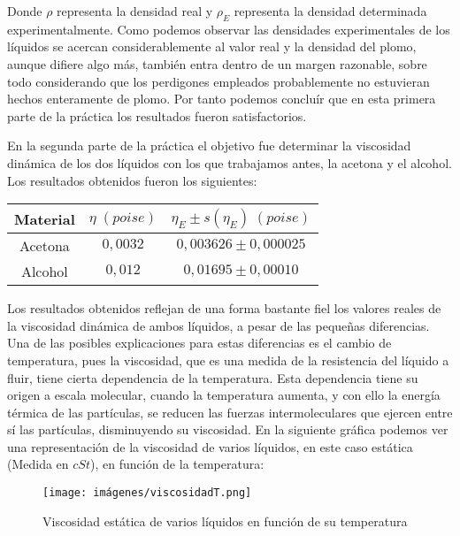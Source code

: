 \documentclass[a4paper,12pt,titlepage]{article}
\begin{document}
Donde $\rho$ representa la densidad real y $\rho_E$ representa la densidad determinada experimentalmente. Como podemos observar las densidades experimentales de los líquidos se acercan considerablemente al valor real y la densidad del plomo, aunque difiere algo más, también entra dentro de un margen razonable, sobre todo considerando que los perdigones empleados probablemente no estuvieran hechos enteramente de plomo. Por tanto podemos concluír que en esta primera parte de la práctica los resultados fueron satisfactorios.

\par En la segunda parte de la práctica el objetivo fue determinar la viscosidad dinámica de los dos líquidos con los que trabajamos antes, la acetona y el alcohol. Los resultados obtenidos fueron los siguientes:

\newpage

\begin{table}[h!]
    \centering
    \begin{tabular}{|c|c|c|}
        \hline
        Material & $\eta \; (poise)$ & $\eta_E \pm s(\eta_E) \; (poise)$ \\ \hline
        Acetona & $0,0032$ & $0,003626 \pm 0,000025$ \\ \hline
        Alcohol &$0,012$ & $0,01695 \pm  0,00010$\\ \hline
    \end{tabular}
\end{table}

Los resultados obtenidos reflejan de una forma bastante fiel los valores reales de la viscosidad dinámica de ambos líquidos, a pesar de las pequeñas diferencias. Una de las posibles explicaciones para estas diferencias es el cambio de temperatura, pues la viscosidad, que es una medida de la resistencia del líquido a fluir, tiene cierta dependencia de la temperatura. Esta dependencia tiene su origen a escala molecular, cuando la temperatura aumenta, y con ello la energía térmica de las partículas, se reducen las fuerzas intermoleculares que ejercen entre sí las partículas, disminuyendo su viscosidad. En la siguiente gráfica podemos ver una representación de la viscosidad de varios líquidos, en este caso estática (Medida en $cSt$), en función de la temperatura:

\begin{figure}[h!]
    \centering
    \texttt{[image: imágenes/viscosidadT.png]}
    \caption{Viscosidad estática de varios líquidos en función de su temperatura}
\end{figure}
\end{document}

